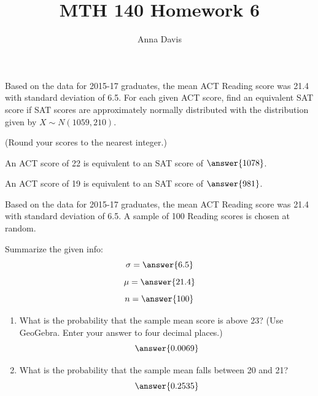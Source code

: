 \documentclass{ximera}
\author{Anna Davis} \title{MTH 140 Homework 6}
\begin{document}
\begin{abstract}

\end{abstract}
\maketitle
 
 
 \begin{problem}\label{prob:140hom7extra1}
 Based on the data for 2015-17 graduates, the mean ACT Reading score was 21.4 with standard deviation of 6.5.  For each given ACT score, find an equivalent SAT score if SAT scores are approximately normally distributed with the distribution given by $X\sim N(1059,210)$.
 
 (Round your scores to the nearest integer.)
 
 An ACT score of 22 is equivalent to an SAT score of $\answer{1078}$.
 
 An ACT score of 19 is equivalent to an SAT score of $\answer{981}$.
 
 \end{problem}
 
  \begin{problem}\label{prob:140hom6prob2}
 Based on the data for 2015-17 graduates, the mean ACT Reading score was 21.4 with standard deviation of 6.5.  A sample of 100 Reading scores is chosen at random. 
 
 Summarize the given info:
$$\sigma=\answer{6.5}$$
$$\mu=\answer{21.4}$$
$$n=\answer{100}$$

\begin{center}  
\end{center}
\begin{enumerate}
\item
What is the probability that the sample mean score is above 23?  (Use GeoGebra.  Enter your answer to four decimal places.)
$$\answer{0.0069}$$
\item What is the probability that the sample mean falls between 20 and 21?
$$\answer{0.2535}$$
\end{enumerate}
\end{problem}
\end{document}
